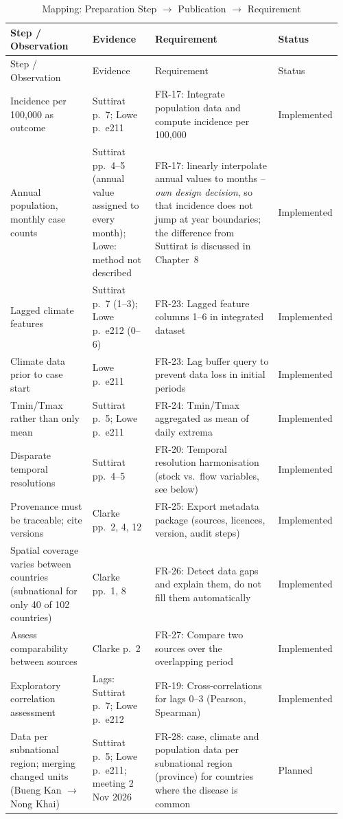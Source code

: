 \documentclass[11pt,a4paper]{article}
\begin{document}
\begin{longtable}{@{}p{0.25\linewidth}p{0.19\linewidth}p{0.38\linewidth}p{0.14\linewidth}@{}}
\caption{Mapping: Preparation Step $\rightarrow$ Publication $\rightarrow$ Requirement}\label{tab:trace}\\
\toprule
Step / Observation & Evidence & Requirement & Status \\
\midrule
\endfirsthead
\toprule
Step / Observation & Evidence & Requirement & Status \\
\midrule
\endhead
Incidence per 100,000 as outcome & Suttirat p.~7; Lowe p.~e211 &
  FR-17: Integrate population data and compute incidence per 100,000 & Implemented \\
Annual population, monthly case counts & Suttirat pp.~4--5 (annual value assigned to every month); Lowe: method not described &
  FR-17: linearly interpolate annual values to months -- \emph{own design decision}, so that incidence does not jump at year boundaries; the difference from Suttirat is discussed in Chapter~8 & Implemented \\
Lagged climate features & Suttirat p.~7 (1--3); Lowe p.~e212 (0--6) &
  FR-23: Lagged feature columns 1--6 in integrated dataset & Implemented \\
Climate data prior to case start & Lowe p.~e211 &
  FR-23: Lag buffer query to prevent data loss in initial periods & Implemented \\
Tmin/Tmax rather than only mean & Suttirat p.~5; Lowe p.~e211 &
  FR-24: Tmin/Tmax aggregated as mean of daily extrema & Implemented \\
Disparate temporal resolutions & Suttirat pp.~4--5 &
  FR-20: Temporal resolution harmonisation (stock vs.\ flow variables, see below) & Implemented \\
Provenance must be traceable; cite versions & Clarke pp.~2, 4, 12 &
  FR-25: Export metadata package (sources, licences, version, audit steps) & Implemented \\
Spatial coverage varies between countries (subnational for only 40 of 102 countries) & Clarke pp.~1, 8 &
  FR-26: Detect data gaps and explain them, do not fill them automatically & Implemented \\
Assess comparability between sources & Clarke p.~2 &
  FR-27: Compare two sources over the overlapping period & Implemented \\
Exploratory correlation assessment & Lags: Suttirat p.~7; Lowe p.~e212 &
  FR-19: Cross-correlations for lags 0--3 (Pearson, Spearman) & Implemented \\
Data per subnational region; merging changed units (Bueng Kan $\rightarrow$ Nong Khai) & Suttirat p.~5; Lowe p.~e211; meeting 2 Nov 2026 &
  FR-28: case, climate and population data per subnational region (province) for countries where the disease is common & Planned \\
\bottomrule
\end{longtable}
\end{document}
